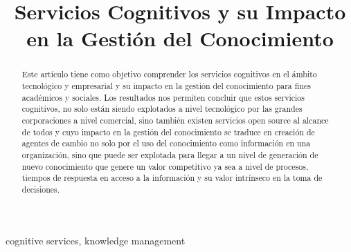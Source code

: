 \documentclass[conference]{IEEEtran}
\begin{document}
\title{Servicios Cognitivos y su Impacto en la Gestión del Conocimiento}

\author{
\and
{}
\and
{}
\and
{}
}

\maketitle

\begin{abstract}
Este artículo tiene como objetivo comprender los servicios cognitivos en el ámbito tecnológico y empresarial y su impacto en la gestión del conocimiento para fines académicos y sociales. Los resultados nos permiten concluir que estos servicios cognitivos, no solo están siendo explotados a nivel tecnológico por las grandes corporaciones a nivel comercial, sino también existen servicios open source al alcance de todos y cuyo impacto en la gestión del conocimiento se traduce en creación de agentes de cambio no solo por el uso del conocimiento como información en una organización, sino que puede ser explotada para llegar a un nivel de generación de nuevo conocimiento que genere un valor competitivo ya sea a nivel de procesos, tiempos de respuesta en acceso  a la información y su valor intrínseco en la toma de decisiones.
\end{abstract}

\begin{IEEEkeywords}
cognitive services, knowledge management
\end{IEEEkeywords}










\end{document}
